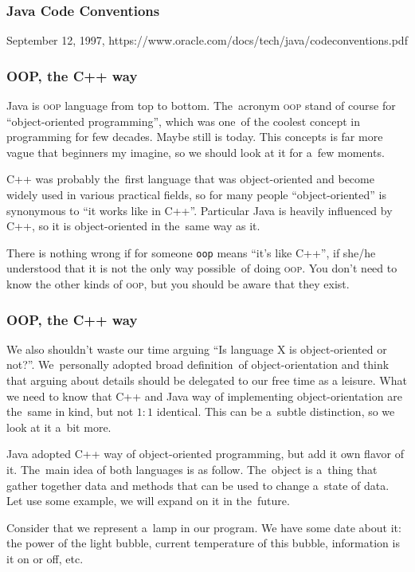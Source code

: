 \documentclass[10pt,t]{beamer}
\begin{document}
\begin{frame}
  \frametitle{Java Code Conventions}


  September 12, 1997,
  https://www.oracle.com/docs/tech/java/codeconventions.pdf

\end{frame}





\begin{frame}
  \frametitle{OOP, the C++ way}


  Java is
  {\textsc{oop}} language from top to bottom. The~acronym \textsc{oop}
  stand of course for ``object-oriented programming'', which was one~of
  the coolest concept in programming for few decades. Maybe still is today.
  This concepts is far more vague that beginners my imagine, so we should
  look at it for a~few moments.

  C++ was probably the~first language that was object-oriented and become
  widely used in various practical fields, so for many people
  ``object-oriented'' is synonymous to ``it works like in C++''. Particular
  Java is heavily influenced by C++, so it is object-oriented in the~same
  way as it.

  There is nothing wrong if for someone \texttt{oop} means ``it's like
  C++'', if she/he understood that it is not the only way possible~of
  doing \textsc{oop}. You don't need to know the other kinds of
  \textsc{oop}, but you should be aware that they exist.

\end{frame}





\begin{frame}
  \frametitle{OOP, the C++ way}


  We also shouldn't waste our time arguing ``Is language X is
  object-oriented or not?''. We~personally adopted broad definition~of
  object-orientation and think that arguing about details should be
  delegated to our free time as a leisure. What we need to know that C++
  and Java way of implementing object-orientation are the~same in kind, but
  not $1:1$ identical. This can be a~subtle distinction, so we look at it
  a~bit more.

  Java adopted C++ way of object-oriented programming, but add it own flavor
  of it. The~main idea of both languages is as follow. The~object
  is a~thing that gather together data and methods that can be used to
  change a~state of data. Let use some example, we will expand on it
  in the~future.

  Consider that we represent a~lamp in our program. We have some date
  about it: the power of the light bubble, current temperature of this
  bubble, information is it on or off, etc.

\end{frame}
\end{document}
